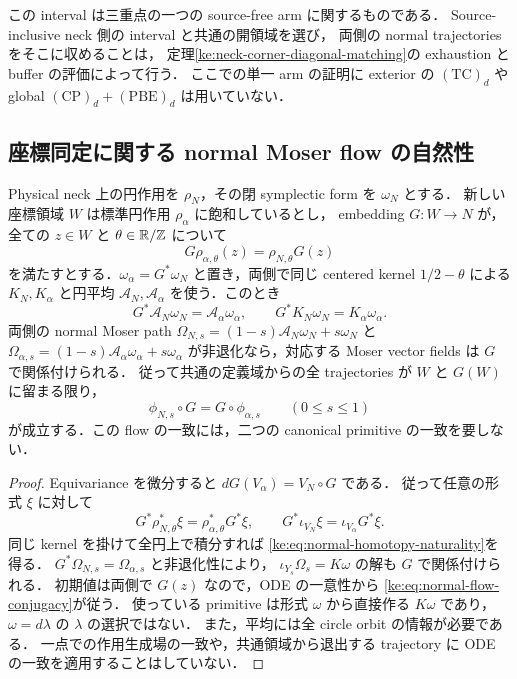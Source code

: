 この interval は三重点の一つの source-free arm に関するものである．
Source-inclusive neck 側の interval と共通の開領域を選び，
両側の normal trajectories をそこに収めることは，
定理\ref{ke:neck-corner-diagonal-matching}の exhaustion と buffer の評価によって行う．
ここでの単一 arm の証明に exterior の $(\mathrm{TC})_d$ や
global $(\mathrm{CP})_d+(\mathrm{PBE})_d$ は用いていない．

\subsection{座標同定に関する normal Moser flow の自然性}

\begin{lemma}
\label{ke:normal-flow-naturality}
Physical neck 上の円作用を $\rho_N$，その閉 symplectic form を $\omega_N$ とする．
新しい座標領域 $W$ は標準円作用 $\rho_\alpha$ に飽和しているとし，
embedding $G:W\to N$ が，全ての $z\in W$ と $\theta\in\mathbb R/\mathbb Z$ について
\[
 G\rho_{\alpha,\theta}(z)=\rho_{N,\theta}G(z)
\]
を満たすとする．$\omega_\alpha=G^*\omega_N$ と置き，両側で同じ
centered kernel $1/2-\theta$ による $K_N,K_\alpha$ と円平均
$\mathcal A_N,\mathcal A_\alpha$ を使う．このとき
\begin{equation}\label{ke:eq:normal-homotopy-naturality}
 G^*\mathcal A_N\omega_N=\mathcal A_\alpha\omega_\alpha,
 \qquad G^*K_N\omega_N=K_\alpha\omega_\alpha.
\end{equation}
両側の normal Moser path
$\Omega_{N,s}=(1-s)\mathcal A_N\omega_N+s\omega_N$ と
$\Omega_{\alpha,s}=(1-s)\mathcal A_\alpha\omega_\alpha+s\omega_\alpha$
が非退化なら，対応する Moser vector fields は $G$ で関係付けられる．
従って共通の定義域からの全 trajectories が $W$ と $G(W)$ に留まる限り，
\begin{equation}\label{ke:eq:normal-flow-conjugacy}
 \phi_{N,s}\circ G=G\circ\phi_{\alpha,s}
 \qquad(0\le s\le1)
\end{equation}
が成立する．この flow の一致には，二つの canonical primitive の一致を要しない．
\end{lemma}
\begin{proof}
Equivariance を微分すると $dG(V_\alpha)=V_N\circ G$ である．
従って任意の形式 $\xi$ に対して
\[
 G^*\rho_{N,\theta}^*\xi
 =\rho_{\alpha,\theta}^*G^*\xi,\qquad
 G^*\iota_{V_N}\xi=\iota_{V_\alpha}G^*\xi.
\]
同じ kernel を掛けて全円上で積分すれば
\eqref{ke:eq:normal-homotopy-naturality}を得る．
$G^*\Omega_{N,s}=\Omega_{\alpha,s}$ と非退化性により，
$\iota_{Y_s}\Omega_s=K\omega$ の解も $G$ で関係付けられる．
初期値は両側で $G(z)$ なので，ODE の一意性から
\eqref{ke:eq:normal-flow-conjugacy}が従う．
使っている primitive は形式 $\omega$ から直接作る $K\omega$ であり，
$\omega=d\lambda$ の $\lambda$ の選択ではない．
また，平均には全 circle orbit の情報が必要である．
一点での作用生成場の一致や，共通領域から退出する trajectory に
ODE の一致を適用することはしていない．
\end{proof}

